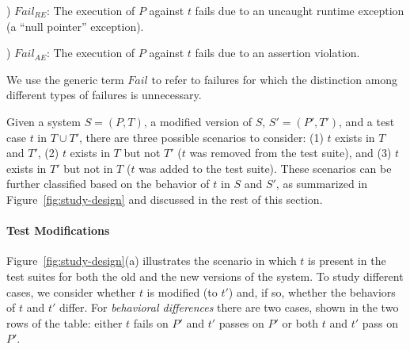 \documentclass[conference]{IEEEtran}
\newcommand{\mt}{\mathit}
\newcommand{\fail}{\mt{Fail}}
\newcommand{\failre}{\mt{Fail}_{RE}}
\newcommand{\failae}{\mt{Fail}_{AE}}
\newcommand{\covfunc}[2]{\mt{Cov(#1, #2)}}
\begin{document}
) $\failre$: The execution of $P$ against $t$ fails due to an
uncaught runtime exception (\eg a ``null pointer'' exception).

) $\failae$: The execution of $P$ against $t$ fails due to an
assertion violation.

We use the generic term $\fail$ to refer to failures for which the
distinction among different types of failures is unnecessary.




Given a system $S = (P, T)$, a modified version of $S$, $S'=(P', T')$,
and a test case $t$ in $T \cup T'$, there are three possible scenarios
to consider: (1) $t$ exists in $T$ and $T'$, (2) $t$ exists in $T$ but
not $T'$ (\ie $t$ was removed from the test suite), and (3) $t$ exists
in $T'$ but not in $T$ (\ie $t$ was added to the test suite). These
scenarios can be further classified based on the behavior of $t$ in
$S$ and $S'$, as summarized in Figure~\ref{fig:study-design} and
discussed in the rest of this section.

\paragraph*{\textbf{Test Modifications}}
\label{sec:test-mod}

Figure~\ref{fig:study-design}(a) illustrates the scenario in which $t$
is present in the test suites for both the old and the new versions of
the system. To study different cases, we consider whether $t$ is
modified (to $t'$) and, if so, whether the behaviors of $t$ and $t'$
differ. For \textit{behavioral differences} there are two cases, shown
in the two rows of the table: either $t$ fails on $P'$ and $t'$ passes
on $P'$ or both $t$ and $t'$ pass on $P'$.
\end{document}
